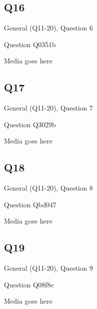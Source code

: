 \documentclass[11pt]{beamer}
\begin{document}
\subsection*{Q16}
\begin{frame}[t]{General (Q11-20), Question 6}
\vspace{2em}
\begin{block}{Question}
Q0351b
\end{block}
\begin{center}
Media goes here
\end{center}
\end{frame}
    

\subsection*{Q17}
\begin{frame}[t]{General (Q11-20), Question 7}
\vspace{2em}
\begin{block}{Question}
Q3029b
\end{block}
\begin{center}
Media goes here
\end{center}
\end{frame}
    

\subsection*{Q18}
\begin{frame}[t]{General (Q11-20), Question 8}
\vspace{2em}
\begin{block}{Question}
Qbd047
\end{block}
\begin{center}
Media goes here
\end{center}
\end{frame}
    

\subsection*{Q19}
\begin{frame}[t]{General (Q11-20), Question 9}
\vspace{2em}
\begin{block}{Question}
Q08f8e
\end{block}
\begin{center}
Media goes here
\end{center}
\end{frame}
    
\end{document}
